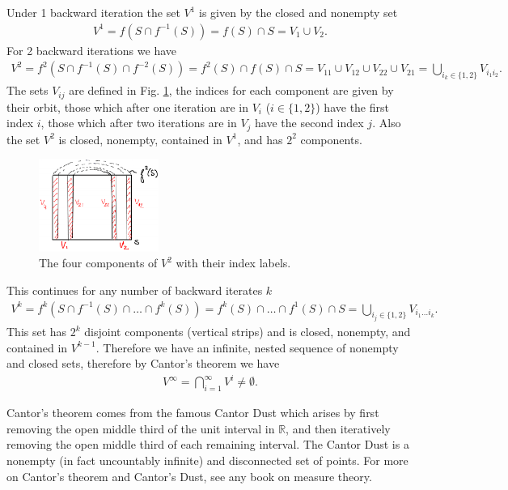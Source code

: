  Under 1 backward iteration the set $V^{1}$ is given by the closed and nonempty set
	\begin{align}
		V^{1} = f \left( S \cap f^{-1}(S) \right) = f(S) \cap S = V_1 \cup V_2.
	\end{align}
For 2 backward iterations we have
\begin{align}
	V^{2} = f^{2}\left(S \cap f^{-1}(S) \cap f^{-2}(S) \right) = f^{2}(S) \cap f(S) \cap S  = V_{11} \cup V_{12} \cup V_{22} \cup V_{21} = \bigcup_{i_k \in \{1,2\}} V_{i_1i_2}.
\end{align}
The sets $V_{ij}$ are defined in Fig. \ref{fig:V_subsets}, the indices for each component are given by their orbit, those which after one iteration are in $V_i$ ($i\in\{1,2\}$) have the first index $i$, those which after two iterations are in $V_{j}$ have the second index $j$. Also the set $V^{2}$ is closed, nonempty, contained in $V^{1}$, and has $2^2$ components.
\begin{figure}[h!]
	\centering
	\includegraphics[width=0.35\textwidth]{figures/ch6/18V_subsets.png}
	\caption{The four components of $V^{2}$ with their index labels.}
	\label{fig:V_subsets}
\end{figure}

This continues for any number of backward iterates $k$ 
\begin{align}
	V^{k} = f^{k}\left(S \cap f^{-1}(S) \cap \ldots \cap f^{k}(S)\right) = f^{k}(S) \cap \ldots \cap f^{1}(S) \cap S = \bigcup_{i_j \in \{1,2\}}V_{i_1 \ldots i_k}.
\end{align}
This set has $2^k$ disjoint components (vertical strips) and is closed, nonempty, and contained in $V^{k-1}$. Therefore we have an infinite, nested sequence of nonempty and closed sets, therefore by Cantor's theorem we have 
\begin{align}
\boxed{
	V^{\infty } = \bigcap_{i=1}^{\infty } V^{i} \neq \emptyset.
}
\end{align}

\begin{remark}[]
	Cantor's theorem comes from the famous Cantor Dust which arises by first removing the open middle third of the unit interval in $\mathbb{R}$, and then iteratively removing the open middle third of each remaining interval. The Cantor Dust is a nonempty (in fact uncountably infinite) and disconnected set of points. For more on Cantor's theorem and Cantor's Dust, see any book on measure theory.
\end{remark}

